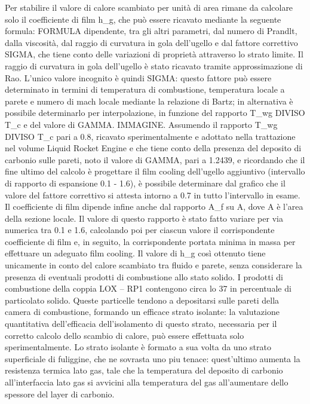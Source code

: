 Per stabilire il valore di calore scambiato per unità di area rimane da calcolare solo il coefficiente di film h_g, che può essere ricavato mediante la seguente formula: FORMULA
dipendente, tra gli altri parametri, dal numero di Prandlt, dalla viscosità, dal raggio di curvatura in gola dell'ugello e dal fattore correttivo SIGMA, che tiene conto delle variazioni di proprietà attraverso lo strato limite. 
Il raggio di curvatura in gola dell'ugello è stato ricavato tramite approssimazione di Rao. 
L'unico valore incognito è quindi SIGMA: questo fattore può essere determinato in termini di temperatura di combustione, temperatura locale a parete e numero di mach locale mediante la relazione di Bartz; in alternativa è possibile determinarlo per interpolazione, in funzione del rapporto T_{wg} DIVISO T_c e del valore di GAMMA. IMMAGINE. Assumendo il rapporto T_{wg} DIVISO T_c pari a 0.8, ricavato sperimentalmente e adottato nella trattazione nel volume Liquid Rocket Engine e che tiene conto della presenza del deposito di carbonio sulle pareti, noto il valore di GAMMA, pari a 1.2439, e ricordando che il fine ultimo del calcolo è progettare il film cooling dell'ugello aggiuntivo (intervallo di rapporto di espansione 0.1 - 1.6), è possibile determinare dal grafico che il valore del fattore correttivo si attesta intorno a 0.7 in tutto l'intervallo in esame.
Il coefficiente di film dipende infine anche dal rapporto A_f su A, dove A è l'area della sezione locale. Il valore di questo rapporto è stato fatto variare per via numerica tra 0.1 e 1.6, calcolando poi per ciascun valore il corrispondente coefficiente di film e, in seguito, la corrispondente portata minima in massa per effettuare un adeguato film cooling.
Il valore di h_g così ottenuto tiene unicamente in conto del calore scambiato tra fluido e parete, senza considerare la presenza di eventuali prodotti di combustione allo stato solido. I prodotti di combustione della coppia LOX – RP1 contengono circa lo 37 in percentuale di particolato solido. Queste particelle tendono a depositarsi sulle pareti della camera di combustione, formando un efficace strato isolante: la valutazione quantitativa dell’efficacia dell’isolamento di questo strato, necessaria per il corretto calcolo dello scambio di calore, può essere effettuata solo sperimentalmente. Lo strato isolante è formato a sua volta da uno strato superficiale di fuliggine, che ne sovrasta uno piu tenace: quest’ultimo aumenta la resistenza termica lato gas, tale che la temperatura del deposito di carbonio all’interfaccia lato gas si avvicini alla temperatura del gas all’aumentare dello spessore del layer di carbonio.
